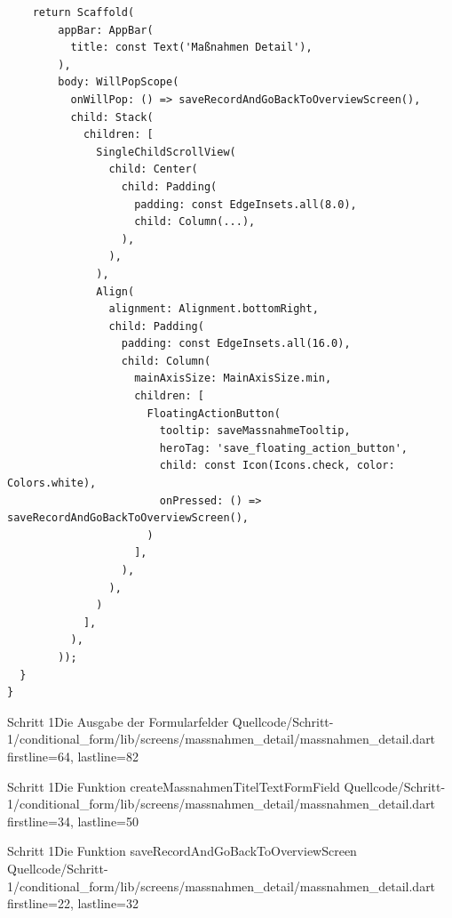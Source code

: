 {\begin{listing}[htbp]
\begin{verbatim}
    return Scaffold(
        appBar: AppBar(
          title: const Text('Maßnahmen Detail'),
        ),
        body: WillPopScope(
          onWillPop: () => saveRecordAndGoBackToOverviewScreen(),
          child: Stack(
            children: [
              SingleChildScrollView(
                child: Center(
                  child: Padding(
                    padding: const EdgeInsets.all(8.0),
                    child: Column(...),
                  ),
                ),
              ),
              Align(
                alignment: Alignment.bottomRight,
                child: Padding(
                  padding: const EdgeInsets.all(16.0),
                  child: Column(
                    mainAxisSize: MainAxisSize.min,
                    children: [
                      FloatingActionButton(
                        tooltip: saveMassnahmeTooltip,
                        heroTag: 'save_floating_action_button',
                        child: const Icon(Icons.check, color: Colors.white),
                        onPressed: () => saveRecordAndGoBackToOverviewScreen(),
                      )
                    ],
                  ),
                ),
              )
            ],
          ),
        ));
  }
}
\end{verbatim}
  \caption[Schritt 1 Klasse MassnahmenDetailScreen Struktur]{Die Struktur des Bildschirms MassnahmenDetailScreen, Quelle: Eigenes Listing, Datei: Quellcode/Schritt-1/conditional_form/lib/\newline screens/massnahmen_detail/massnahmen_detail.dart}
  \label{lst:Schritt1KlasseMassnahmenDetailScreenStruktur}
\end{listing}


\begin{alexlisting}{Schritt 1}{Die Ausgabe der Formularfelder}
  {Quellcode/Schritt-1/conditional_form/lib/screens/massnahmen_detail/massnahmen_detail.dart}
  {firstline=64, lastline=82}
  \label{lst:Schritt1AusgabeDerFormularfelder}
\end{alexlisting}

\begin{alexlisting}{Schritt 1}{Die Funktion createMassnahmenTitelTextFormField}
  {Quellcode/Schritt-1/conditional_form/lib/screens/massnahmen_detail/massnahmen_detail.dart}
  {firstline=34, lastline=50}
  \label{lst:Schritt1DieFunktionCreateMassnahmenTitelTextFormField}
\end{alexlisting}

\begin{alexlisting}{Schritt 1}{Die Funktion saveRecordAndGoBackToOverviewScreen}
  {Quellcode/Schritt-1/conditional_form/lib/screens/massnahmen_detail/massnahmen_detail.dart}
  {firstline=22, lastline=32}
  \label{lst:Schritt1SaveRecordAndGoBackToOverviewScreen}
\end{alexlisting}





}
